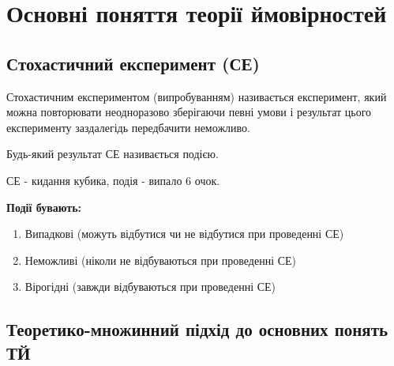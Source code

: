 
\section{Основні поняття теорії ймовірностей}
\subsection*{Стохастичний експеримент (СЕ)}
\begin{definition}
    Стохастичним експериментом (випробуванням) називається експеримент, 
    який можна повторювати неодноразово зберігаючи певні умови і результат цього 
    експерименту заздалегідь передбачити неможливо.
\end{definition}
\begin{definition}
    Будь-який результат СЕ називається подією.
\end{definition}
\begin{example}
    СЕ - кидання кубика, подія - випало 6 очок.
\end{example}

\textbf{Події бувають:}
\begin{enumerate}
    \item Випадкові (можуть відбутися чи не відбутися при проведенні СЕ)
    \item Неможливі (ніколи не відбуваються при проведенні СЕ)
    \item Вірогідні (завжди відбуваються при проведенні СЕ)
\end{enumerate}
\subsection*{Теоретико-множинний підхід до основних понять ТЙ}
